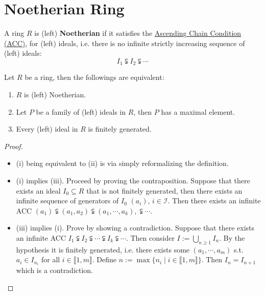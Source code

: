 \documentclass{article}
\begin{document}
\newpage
\section{Noetherian Ring}

\begin{lemma} \label{lem:Zorn}
    
\end{lemma}

\begin{definition}
    A ring $R$ is (left) \textbf{Noetherian} if it satisfies the \underline{Ascending Chain Condition (ACC)}, for (left) ideals, i.e. there is no infinite strictly increasing sequence of (left) ideals:
    \[
        I_1 \subsetneqq I_2 \subsetneqq \cdots
    \]
\end{definition}

\begin{proposition}\label{prop:Noeth f.g.}
    Let $R$ be a ring, then the followings are equivalent:
    \begin{enumerate}
        \item $R$ is (left) Noetherian.
        \item Let $P$ be a family of (left) ideals in $R$, then $P$ has a maximal element.
        \item Every (left) ideal in $R$ is finitely generated.  
    \end{enumerate}
\end{proposition}

\begin{proof}
    \begin{itemize}
        \item (i) being equivalent to (ii) is via simply reformalizing the definition.
        \item (i) implies (iii). Proceed by proving the contraposition. Suppose that there exists an ideal $I_0 \subseteq R$ that is not finitely generated, then there exists an infinite sequence of generators of $I_0$ $(a_i)$, $i\in \mathcal{I}$. Then there exists an infinite ACC $(a_1) \subsetneqq (a_1, a_2) \subsetneqq (a_1, \cdots, a_k), \subsetneqq\cdots$. 
        \item (iii) implies (i). Prove by showing a contradiction. Suppose that there exists an infinite ACC $I_1 \subsetneqq I_2 \subsetneqq \cdots \subsetneqq I_k \subsetneqq\cdots$. Then consider $I := \bigcup_{n\geq 1} I_n$. By the hypothesis it is finitely generated, i.e. there exists some $(a_1, \cdots, a_m)$ s.t. $a_i \in I_{n_i}$ for all $i\in \llbracket 1, m \rrbracket$. Define $n := \max\{ n_i \mid i\in \llbracket 1, m \rrbracket \}$. Then $I_n = I_{n+1}$ which is a contradiction.
    \end{itemize}
\end{proof}
\end{document}
